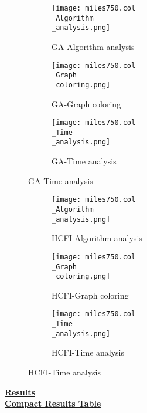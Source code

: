 \documentclass[10pt]{article}
\begin{document}
\graphicspath{{./Core1/Solutions/GA/miles750.col}}
\begin{figure}[H]
\begin{subfigure}{.33\textwidth}
  \centering
  \texttt{[image: miles750.col\\\_Algorithm\\\_analysis.png]}
  \caption{GA-Algorithm analysis}
   \label{fig:subfig1}
\end{subfigure}%
\begin{subfigure}{.33\textwidth}
  \centering
  \texttt{[image: miles750.col\\\_Graph\\\_coloring.png]}
  \caption{GA-Graph coloring}
  \label{fig:subfig2}
\end{subfigure}
\begin{subfigure}{.33\textwidth}
  \centering
  \texttt{[image: miles750.col\\\_Time\\\_analysis.png]}
  \caption{GA-Time analysis}
  \end{subfigure}
\end{figure}

\graphicspath{{./Core1/Solutions/HCFI/miles750.col}}
\begin{figure}[H]
\begin{subfigure}{.33\textwidth}
  \centering
  \texttt{[image: miles750.col\\\_Algorithm\\\_analysis.png]}
  \caption{HCFI-Algorithm analysis}
   \label{fig:subfig1}
\end{subfigure}%
\begin{subfigure}{.33\textwidth}
  \centering
  \texttt{[image: miles750.col\\\_Graph\\\_coloring.png]}
  \caption{HCFI-Graph coloring}
  \label{fig:subfig2}
\end{subfigure}
\begin{subfigure}{.33\textwidth}
  \centering
  \texttt{[image: miles750.col\\\_Time\\\_analysis.png]}
  \caption{HCFI-Time analysis}
  \end{subfigure}
\end{figure}
\vspace{2cm}
\begin{center}
\hyperlink{page.8}{\textbf{Results}}\\
\vspace{0.5cm}
\hyperlink{page.71}{\textbf{Compact Results Table}}
\end{center}
\pagebreak
\end{document}
